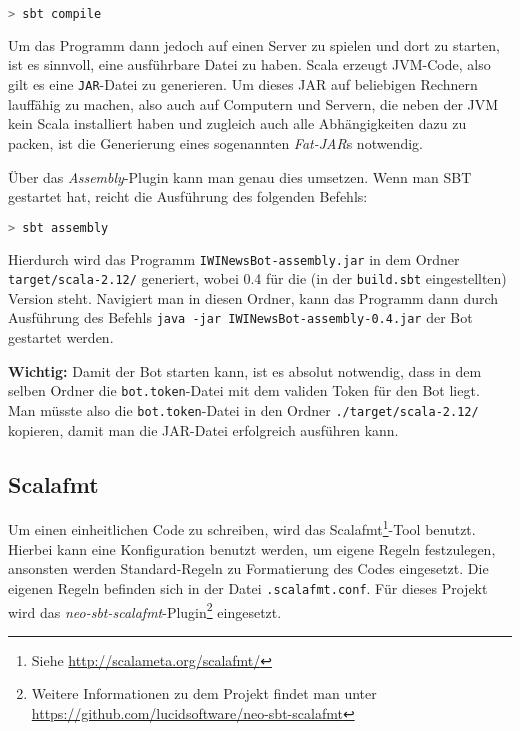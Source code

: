\begin{lstlisting}[language=bash]
> sbt compile
\end{lstlisting}

Um das Programm dann jedoch auf einen Server zu spielen und dort zu starten, ist es sinnvoll, eine ausführbare Datei zu haben. Scala erzeugt JVM-Code, also gilt es eine \texttt{JAR}-Datei zu generieren. Um dieses JAR auf beliebigen Rechnern lauffähig zu machen, also auch auf Computern und Servern, die neben der JVM kein Scala installiert haben und zugleich auch alle Abhängigkeiten dazu zu packen, ist die Generierung eines sogenannten \emph{Fat-JAR}s notwendig.

Über das \emph{Assembly}-Plugin kann man genau dies umsetzen. Wenn man SBT gestartet hat, reicht die Ausführung des folgenden Befehls:

\begin{lstlisting}[language=bash]
> sbt assembly
\end{lstlisting}

Hierdurch wird das Programm \texttt{IWINewsBot\allowbreak-assembly\allowbreak.jar} in dem Ordner \texttt{target\allowbreak/scala-2.12/} generiert, wobei 0.4 für die (in der \texttt{build.sbt} eingestellten) Version steht. Navigiert man in diesen Ordner, kann das Programm dann durch Ausführung des Befehls \texttt{java -jar IWINewsBot-assembly-0.4.jar} der Bot gestartet werden.

\textbf{Wichtig:} Damit der Bot starten kann, ist es absolut notwendig, dass in dem selben Ordner die \texttt{bot.token}-Datei mit dem validen Token für den Bot liegt. Man müsste also die \texttt{bot.token}-Datei in den Ordner \texttt{./target/scala-2.12/} kopieren, damit man die JAR-Datei erfolgreich ausführen kann.

\subsection{Scalafmt}
Um einen einheitlichen Code zu schreiben, wird das Scalafmt\footnote{Siehe \url{http://scalameta.org/scalafmt/}}-Tool benutzt. Hierbei kann eine Konfiguration benutzt werden, um eigene Regeln festzulegen, ansonsten werden Standard-Regeln zu Formatierung des Codes eingesetzt. Die eigenen Regeln befinden sich in der Datei \texttt{.scalafmt.conf}. Für dieses Projekt wird das \emph{neo-sbt-scalafmt}-Plugin\footnote{Weitere Informationen zu dem Projekt findet man unter \url{https://github.com/lucidsoftware/neo-sbt-scalafmt}} eingesetzt.


